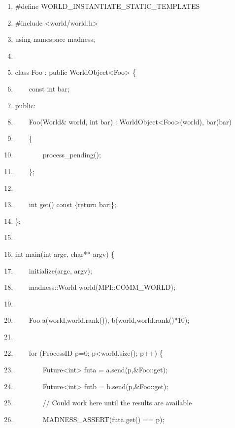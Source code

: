 \documentclass[letterpaper]{article}
\newcommand\liststyleLii{%
\renewcommand\theenumi{\arabic{enumi}}
\renewcommand\theenumii{\arabic{enumii}}
\renewcommand\theenumiii{\arabic{enumiii}}
\renewcommand\theenumiv{\arabic{enumiv}}
\renewcommand\labelenumi{\theenumi.}
\renewcommand\labelenumii{\theenumii.}
\renewcommand\labelenumiii{\theenumiii.}
\renewcommand\labelenumiv{\theenumiv.}
}
\begin{document}
\begin{center}
\begin{minipage}{}
\liststyleLii
\begin{enumerate}
\item {\ttfamily
\#define WORLD\_INSTANTIATE\_STATIC\_TEMPLATES}
\item {\ttfamily
\#include {\textless}world/world.h{\textgreater}}
\item {\ttfamily
using namespace madness;}
\item 
\bigskip
\item {\ttfamily
class Foo : public WorldObject{\textless}Foo{\textgreater} \{}
\item {\ttfamily
\ \ \ \ const int bar;}
\item {\ttfamily
public:}
\item {\ttfamily
\ \ \ \ Foo(World\& world, int bar) : WorldObject{\textless}Foo{\textgreater}(world), bar(bar)}
\item {\ttfamily
\ \ \ \ \{}
\item {\ttfamily
\ \ \ \ \ \ \ \ process\_pending();}
\item {\ttfamily
\ \ \ \ \};}
\item 
\bigskip
\item {\ttfamily
\ \ \ \ int get() const \{return bar;\};}
\item {\ttfamily
\};}
\item 
\bigskip
\item {\ttfamily
int main(int argc, char** argv) \{}
\item {\ttfamily
\ \ \ \ initialize(argc, argv);}
\item {\ttfamily
\ \ \ \ madness::World world(MPI::COMM\_WORLD);}
\item 
\bigskip
\item {\ttfamily
\ \ \ \ Foo a(world,world.rank()), b(world,world.rank()*10);}
\item 
\bigskip
\item {\ttfamily
\ \ \ \ for (ProcessID p=0; p{\textless}world.size(); p++) \{}
\item {\ttfamily
\ \ \ \ \ \ \ \ Future{\textless}int{\textgreater} futa = a.send(p,\&Foo::get);}
\item {\ttfamily
\ \ \ \ \ \ \ \ Future{\textless}int{\textgreater} futb = b.send(p,\&Foo::get);}
\item {\ttfamily
\ \ \ \ \ \ \ \ // Could work here until the results are available}
\item {\ttfamily
\ \ \ \ \ \ \ \ MADNESS\_ASSERT(futa.get() == p);}

\end{enumerate}
\end{minipage}
\end{center}
\end{document}
